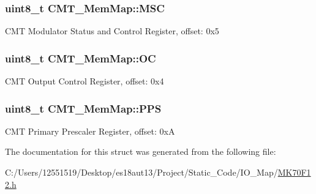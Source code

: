 \subsubsection[{M\+S\+C}]{\setlength{\rightskip}{0pt plus 5cm}uint8\+\_\+t C\+M\+T\+\_\+\+Mem\+Map\+::\+M\+S\+C}\label{struct_c_m_t___mem_map_ad1905c6966e1ac635348ce19d5c44ae9}
C\+M\+T Modulator Status and Control Register, offset\+: 0x5 \hypertarget{struct_c_m_t___mem_map_a67d3243d0c24b20b493fd919433dd84c}{}
\subsubsection[{O\+C}]{\setlength{\rightskip}{0pt plus 5cm}uint8\+\_\+t C\+M\+T\+\_\+\+Mem\+Map\+::\+O\+C}\label{struct_c_m_t___mem_map_a67d3243d0c24b20b493fd919433dd84c}
C\+M\+T Output Control Register, offset\+: 0x4 \hypertarget{struct_c_m_t___mem_map_a3a70b1ee9e4f0c56e0b2f48e059e1590}{}
\subsubsection[{P\+P\+S}]{\setlength{\rightskip}{0pt plus 5cm}uint8\+\_\+t C\+M\+T\+\_\+\+Mem\+Map\+::\+P\+P\+S}\label{struct_c_m_t___mem_map_a3a70b1ee9e4f0c56e0b2f48e059e1590}
C\+M\+T Primary Prescaler Register, offset\+: 0x\+A 

The documentation for this struct was generated from the following file\+:\begin{DoxyCompactItemize}
\item 
C\+:/\+Users/12551519/\+Desktop/es18aut13/\+Project/\+Static\+\_\+\+Code/\+I\+O\+\_\+\+Map/\hyperlink{_m_k70_f12_8h}{M\+K70\+F12.\+h}\end{DoxyCompactItemize}
